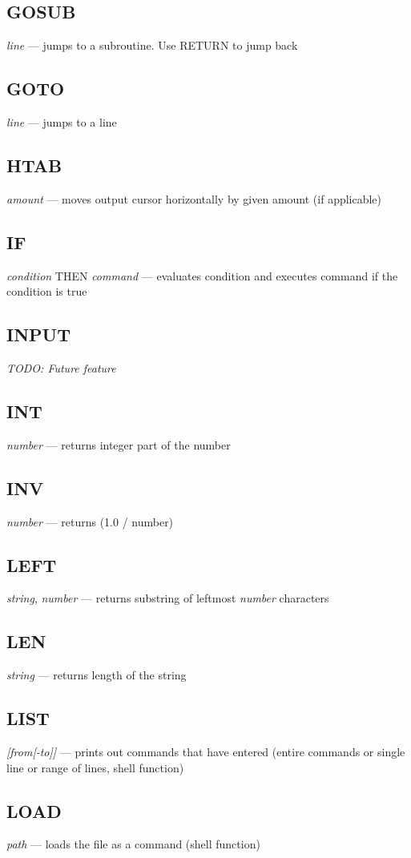 \subsection{GOSUB} \emph{line} --- jumps to a subroutine. Use RETURN to jump back
\subsection{GOTO} \emph{line} --- jumps to a line
\subsection{HTAB} \emph{amount} --- moves output cursor horizontally by given amount (if applicable)
\subsection{IF} \emph{condition} THEN \emph{command} --- evaluates condition and executes command if the condition is true
\subsection{INPUT} \emph{TODO: Future feature}
\subsection{INT} \emph{number} --- returns integer part of the number
\subsection{INV} \emph{number} --- returns (1.0 / number)
\subsection{LEFT} \emph{string}, \emph{number} --- returns substring of leftmost \emph{number} characters
\subsection{LEN} \emph{string} --- returns length of the string
\subsection{LIST} \emph{[from[-to]]} --- prints out commands that have entered (entire commands or single line or range of lines, shell function)
\subsection{LOAD} \emph{path} --- loads the file as a command (shell function)
